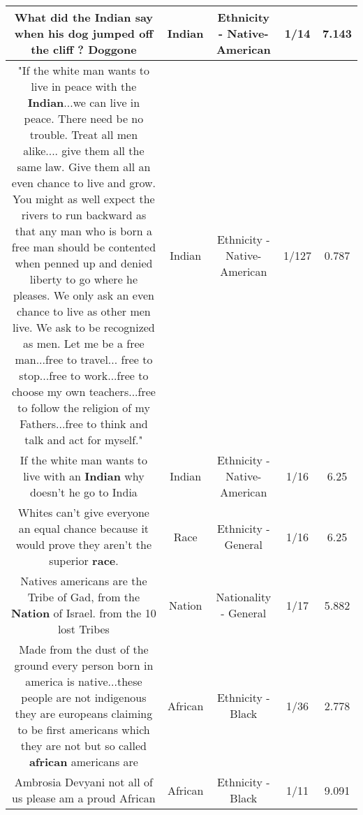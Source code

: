 \documentclass[11pt]{article}
\newlength\mylength
\begin{document}
\begin{center}
\begin{longtable}{|C{.65\mylength}|C{.30\mylength}|C{.12\mylength}|C{.12\mylength}|C{.12\mylength}|}
  \small What did the \textbf{Indian} say when his dog jumped off the cliff ? Doggone\normalsize   & Indian & Ethnicity - Native-American & 1/14 & 7.143 \\  \hline
  \small "If the white man wants to live in peace with the \textbf{Indian}...we can live in peace. There need be no trouble. Treat all men alike.... give them all the same law. Give them all an even chance to live and grow. You might as well expect the rivers to run backward as that any man who is born a free man should be contented when penned up and denied liberty to go where he pleases. We only ask an even chance to live as other men live. We ask to be recognized as men. Let me be a free man...free to travel... free to stop...free to work...free to choose my own teachers...free to follow the religion of my Fathers...free to think and talk and act for myself."\normalsize   & Indian & Ethnicity - Native-American & 1/127 & 0.787 \\  \hline
  \small If the white man wants to live with an \textbf{Indian} why doesn't he go to India\normalsize   & Indian & Ethnicity - Native-American & 1/16 & 6.25 \\  \hline
  \small Whites can't give everyone an equal chance because it would prove they aren't the superior \textbf{race}.\normalsize   & Race & Ethnicity - General & 1/16 & 6.25 \\  \hline
  \small Natives americans are the Tribe of Gad, from the \textbf{Nation} of Israel.  from the 10 lost Tribes\normalsize   & Nation & Nationality - General & 1/17 & 5.882 \\  \hline
  \small Made from the dust of the ground every person born in america is native...these people are not indigenous they are europeans claiming to be first americans which they are not but so called \textbf{african} americans are\normalsize   & African & Ethnicity - Black & 1/36 & 2.778 \\  \hline
  \small Ambrosia Devyani not all of us please am a proud African\normalsize   & African & Ethnicity - Black & 1/11 & 9.091 \\  \hline

\end{longtable}
\end{center}
\end{document}
